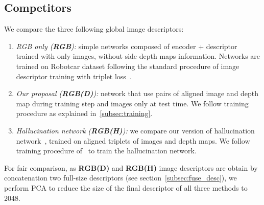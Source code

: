 \subsection{Competitors}
\label{subsec:competitors}
We compare the three following global image descriptors:
\begin{enumerate}
    \item \textit{RGB only (\textbf{RGB}):} simple networks composed of encoder + descriptor trained with only images, without side depth maps information. Networks are trained on Robotcar dataset following the standard procedure of image descriptor training with triplet loss~\cite{Arandjelovic2017, Radenovic2017}.
    \item \textit{Our proposal (\textbf{RGB(D)}):} network that use pairs of aligned image and depth map during training step and images only at test time. We follow training procedure as explained in~\ref{subsec:training}.
	\item \textit{Hallucination network (\textbf{RGB(H)}):} we compare our version of hallucination network~\cite{Hoffman2016}, trained on aligned triplets of images and depth maps. We follow training procedure of~\cite{Hoffman2016} to train the hallucination network.
\end{enumerate}

For fair comparison, as \textbf{RGB(D)} and \textbf{RGB(H)} image descriptors are obtain by concatenation two full-size descriptors (see section~\ref{subsec:fuse_desc}), we perform PCA to reduce the size of the final descriptor of all three methods to 2048.